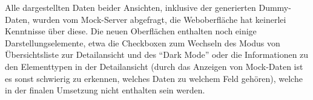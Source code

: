 Alle dargestellten Daten beider Ansichten, inklusive der generierten Dummy-Daten, wurden vom Mock-Server abgefragt, die Weboberfläche hat keinerlei Kenntnisse über diese. Die neuen Oberflächen enthalten noch einige Darstellungselemente, etwa die Checkboxen zum Wechseln des Modus von Übersichtsliste zur Detailansicht und des ``Dark Mode'' oder die Informationen zu den Elementtypen in der Detailansicht (durch das Anzeigen von Mock-Daten ist es sonst schwierig zu erkennen, welches Daten zu welchem Feld gehören), welche in der finalen Umsetzung nicht enthalten sein werden.
